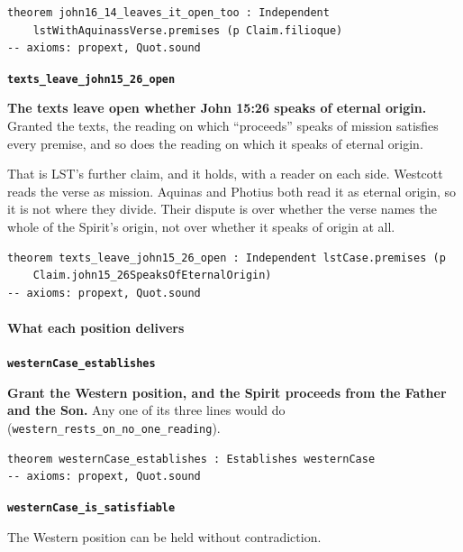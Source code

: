 \documentclass[11pt,paper=\testimonypaper,DIV=13,parskip=false]{scrartcl}
\begin{document}
{\small\begin{verbatim}
theorem john16_14_leaves_it_open_too : Independent
    lstWithAquinassVerse.premises (p Claim.filioque)
-- axioms: propext, Quot.sound
\end{verbatim}}
\par\medskip\noindent\textbf{\texttt{texts\_\allowbreak{}leave\_\allowbreak{}john15\_\allowbreak{}26\_\allowbreak{}open}}\par\nobreak\noindent
\textbf{The texts leave open whether John 15:26 speaks of eternal origin.} Granted the texts, the reading on which “proceeds” speaks of mission satisfies every premise, and so does the reading on which it speaks of eternal origin.

That is LST’s further claim, and it holds, with a reader on each side. Westcott reads the verse as mission. Aquinas and Photius both read it as eternal origin, so it is not where they divide. Their dispute is over whether the verse names the whole of the Spirit’s origin, not over whether it speaks of origin at all.

{\small\begin{verbatim}
theorem texts_leave_john15_26_open : Independent lstCase.premises (p
    Claim.john15_26SpeaksOfEternalOrigin)
-- axioms: propext, Quot.sound
\end{verbatim}}
\paragraph*{What each position delivers}
\leavevmode\par\nobreak
\par\medskip\noindent\textbf{\texttt{western\allowbreak{}Case\_\allowbreak{}establishes}}\par\nobreak\noindent
\textbf{Grant the Western position, and the Spirit proceeds from the Father and the Son.} Any one of its three lines would do (\texttt{western\_\allowbreak{}rests\_\allowbreak{}on\_\allowbreak{}no\_\allowbreak{}one\_\allowbreak{}reading}).

{\small\begin{verbatim}
theorem westernCase_establishes : Establishes westernCase
-- axioms: propext, Quot.sound
\end{verbatim}}
\par\medskip\noindent\textbf{\texttt{western\allowbreak{}Case\_\allowbreak{}is\_\allowbreak{}satisfiable}}\par\nobreak\noindent
The Western position can be held without contradiction.
\end{document}
